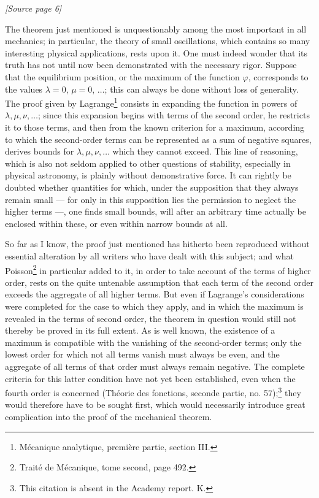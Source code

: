 \documentclass[11pt]{article}
\newcommand{\sourcepage}[1]{\par\smallskip\noindent\textit{[Source page #1]}\par\smallskip}
\begin{document}
\sourcepage{6}

The theorem just mentioned is unquestionably among the most important in all mechanics; in particular, the theory of small oscillations, which contains so many interesting physical applications, rests upon it. One must indeed wonder that its truth has not until now been demonstrated with the necessary rigor. Suppose that the equilibrium position, or the maximum of the function $\varphi$, corresponds to the values $\lambda=0$, $\mu=0$, $\ldots$; this can always be done without loss of generality. The proof given by Lagrange\footnote{Mécanique analytique, première partie, section III.} consists in expanding the function in powers of $\lambda,\mu,\nu,\ldots$; since this expansion begins with terms of the second order, he restricts it to those terms, and then from the known criterion for a maximum, according to which the second-order terms can be represented as a sum of negative squares, derives bounds for $\lambda,\mu,\nu,\ldots$ which they cannot exceed. This line of reasoning, which is also not seldom applied to other questions of stability, especially in physical astronomy, is plainly without demonstrative force. It can rightly be doubted whether quantities for which, under the supposition that they always remain small --- for only in this supposition lies the permission to neglect the higher terms ---, one finds small bounds, will after an arbitrary time actually be enclosed within these, or even within narrow bounds at all.

So far as I know, the proof just mentioned has hitherto been reproduced without essential alteration by all writers who have dealt with this subject; and what Poisson\footnote{Traité de Mécanique, tome second, page 492.} in particular added to it, in order to take account of the terms of higher order, rests on the quite untenable assumption that each term of the second order exceeds the aggregate of all higher terms. But even if Lagrange's considerations were completed for the case to which they apply, and in which the maximum is revealed in the terms of second order, the theorem in question would still not thereby be proved in its full extent. As is well known, the existence of a maximum is compatible with the vanishing of the second-order terms; only the lowest order for which not all terms vanish must always be even, and the aggregate of all terms of that order must always remain negative. The complete criteria for this latter condition have not yet been established, even when the fourth order is concerned (Théorie des fonctions, seconde partie, no. 57);\footnote{This citation is absent in the Academy report. K.} they would therefore have to be sought first, which would necessarily introduce great complication into the proof of the mechanical theorem.
\end{document}
